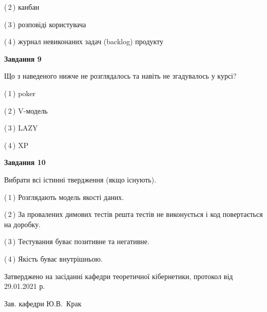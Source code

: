 \documentclass[10pt, ukrainian]{article}
\begin{document}
{\begin {large}
(\,2\,) канбан%



(\,3\,) розповіді користувача%



(\,4\,) журнал невиконаних задач (backlog) продукту%


{\begin {center}\textbf{Завдання 9}\end {center}}\par
Що з наведеного нижче не розглядалось та навіть не згадувалось у курсі?\par
\vspace{2mm}



(\,1\,) poker%



(\,2\,) V-модель%



(\,3\,) LAZY%



(\,4\,) XP%


{\begin {center}\textbf{Завдання 10}\end {center}}\par
Вибрати всі істинні твердження (якщо існують).\par
\vspace{2mm}



(\,1\,) Розглядають модель якості даних.%



(\,2\,) За провалених димових тестів решта тестів не виконується і код повертається на доробку.%



(\,3\,) Тестування буває позитивне та негативне.%



(\,4\,) Якість буває внутрішньою.%



\end {large}}
{\vspace{5mm}\smallskip \begin {small} Затверджено на засіданні кафедри теоретичної кібернетики, протокол  від   29.01.2021 р.\par\smallskip\smallskip
{\parbox {6.5 cm}{Зав. кафедри \dotfill Ю.В.~Крак}} \end{small}}
\newpage
\end{document}
